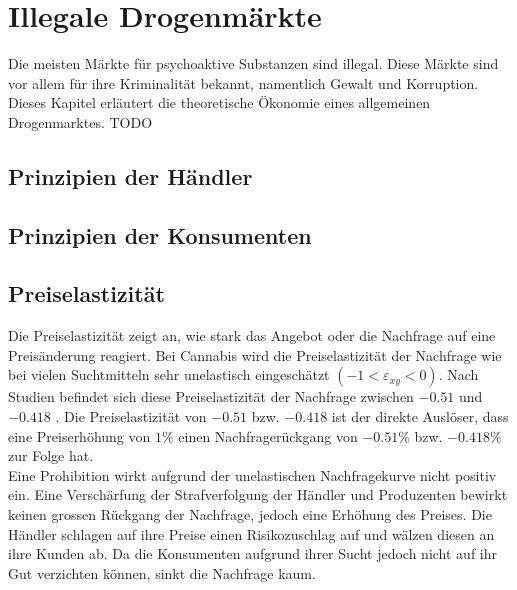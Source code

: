 \documentclass[../main.tex]{subfiles}
\begin{document}
 	\section{Illegale Drogenmärkte}
	Die meisten Märkte für psychoaktive Substanzen sind illegal.
	Diese Märkte sind vor allem für ihre Kriminalität bekannt, namentlich Gewalt und Korruption. 
	Dieses Kapitel erläutert die theoretische Ökonomie eines allgemeinen Drogenmarktes. TODO
	 
	
	\subsection{Prinzipien der Händler}
	
	\subsection{Prinzipien der Konsumenten}

	\subsection{Preiselastizität}
	Die Preiselastizität zeigt an, wie stark das Angebot oder die Nachfrage auf eine Preisänderung reagiert.
	Bei Cannabis wird die Preiselastizität der Nachfrage wie bei vielen Suchtmitteln sehr unelastisch eingeschätzt $(-1<\varepsilon_{xy}<0)$. 
	Nach Studien befindet sich diese Preiselastizität der Nachfrage zwischen $-0.51$ \cite{golzar} und $-0.418$ \cite{halcoussis}.
	Die Preiselastizität von $-0.51$ bzw. $-0.418$ ist der direkte Auslöser, dass eine Preiserhöhung von $1\%$ einen Nachfragerückgang von $-0.51\%$ bzw. $-0.418\%$ zur Folge hat.\\
	
	\noindent
	Eine Prohibition wirkt aufgrund der unelastischen Nachfragekurve nicht positiv ein.
	Eine Verschärfung der Strafverfolgung der Händler und Produzenten bewirkt keinen grossen Rückgang der Nachfrage, jedoch eine Erhöhung des Preises.
	Die Händler schlagen auf ihre Preise einen Risikozuschlag auf und wälzen diesen an ihre Kunden ab.
	Da die Konsumenten aufgrund ihrer Sucht jedoch nicht auf ihr Gut verzichten können, sinkt die Nachfrage kaum.\\
	
\end{document}
